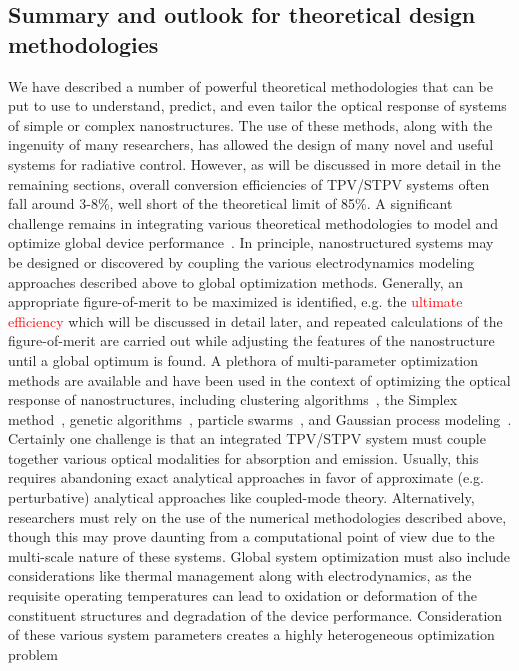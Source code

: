 \documentclass[review]{elsarticle}
\begin{document}
\subsection{Summary and outlook for theoretical design methodologies}
We have described a number of powerful theoretical methodologies that can be put to use to understand, predict, and even tailor the optical
response of systems of simple or complex nanostructures.  The use of these methods, along with the ingenuity of many researchers, has
allowed the design of many novel and useful systems for radiative control.  However, as will be discussed in more detail in the remaining sections, 
overall conversion efficiencies of TPV/STPV systems often fall around 3-8\%,  well short of the theoretical limit of 85\%.  A significant challenge remains in integrating
various theoretical methodologies to model and optimize global device performance~\cite{g4,g9}.
In principle, nanostructured systems may be designed or discovered by coupling the various electrodynamics modeling approaches described above 
to global optimization methods.  Generally, an appropriate figure-of-merit to be maximized is identified, e.g. the \textcolor{red}{ultimate efficiency} which will
be discussed in detail later, and repeated calculations of the figure-of-merit are carried out while adjusting the features of the nanostructure until 
a global optimum is found.  A plethora of multi-parameter optimization methods are available and have been used in the context of optimizing the 
optical response of nanostructures, including clustering algorithms~\cite{g4}, the Simplex method~\cite{Simplex, CH_APL_2006}, genetic algorithms~\cite{ga,DB_JApplPhys_2007}, 
particle swarms~\cite{NDJ_JApplPhys_2012, ParticleSwarm}, and Gaussian
process modeling~\cite{miller1}.  Certainly one
challenge is that an integrated TPV/STPV system must couple together various optical modalities for absorption and emission.  Usually, this requires
abandoning exact analytical approaches in favor of approximate (e.g. perturbative) analytical approaches like coupled-mode theory.  Alternatively,
researchers must rely on the use of the numerical methodologies described above, 
though this may
prove daunting from a computational point of view due to the multi-scale nature of these systems.
Global system optimization must also include considerations like thermal management along with electrodynamics, as the
requisite operating temperatures can lead to oxidation or deformation of the
constituent structures and degradation of the device performance.  
Consideration of these various system parameters creates a highly heterogeneous optimization problem
\end{document}
